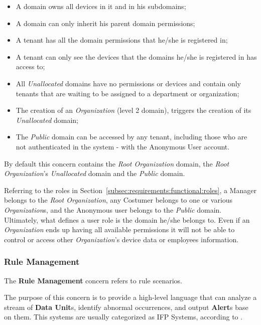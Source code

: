 \begin{itemize}
   \item A domain owns all devices in it and in his subdomains;
   \item A domain can only inherit his parent domain permissions;
   \item A tenant has all the domain permissions that he/she is registered in;
   \item A tenant can only see the devices that the domains he/she is registered in has access to;
   \item All \textit{Unallocated} domains have no permissions or devices and contain only tenants that are waiting to be assigned to a department or organization;
   \item The creation of an \textit{Organization} (level 2 domain), triggers the creation of its \textit{Unallocated} domain;
   \item The \textit{Public} domain can be accessed by any tenant, including those who are not authenticated in the system - with the Anonymous User account.
\end{itemize}

By default this concern contains the \textit{Root Organization} domain, the \textit{Root Organization}'s  \textit{Unallocated} domain and the \textit{Public} domain.

Referring to the roles in Section~\ref{subsec:requirements:functional:roles}, a Manager belongs to the \textit{Root Organization}, any Costumer belongs to one or various \textit{Organization}s, and the Anonymous user belongs to the \textit{Public} domain.
Ultimately, what defines a user role is the domain he/she belongs to. Even if an \textit{Organization} ends up having all available permissions it will not be able to control or access other \textit{Organization}'s device data or employees information.

\subsubsection{Rule Management}
\label{subsubsec:design:domain:bounded_contexts:rule}

The \textbf{Rule Management} concern refers to rule scenarios.

The purpose of this concern is to provide a high-level language that can analyze a stream of \textbf{Data Unit}s, identify abnormal occurrences, and output \textbf{Alert}s base on them. This systems are usually categorized as \gls{IFP} Systems, according to \cite{cugola2012processing}.

